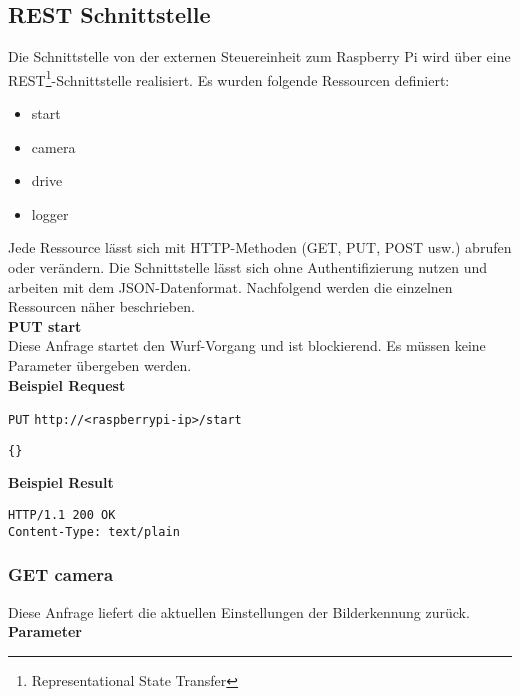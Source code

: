 \subsection{REST Schnittstelle}
\label{sec:rest-schnittstelle}

Die Schnittstelle von der externen Steuereinheit zum Raspberry Pi wird über eine REST\footnote{Representational State Transfer}-Schnittstelle realisiert. Es wurden folgende Ressourcen definiert:
\begin{itemize}
	\item start
	\item camera
	\item drive
	\item logger
\end{itemize}
Jede Ressource lässt sich mit HTTP-Methoden (GET, PUT, POST usw.) abrufen oder verändern. Die Schnittstelle lässt sich ohne Authentifizierung nutzen und arbeiten mit dem JSON-Datenformat. Nachfolgend werden die einzelnen Ressourcen näher beschrieben.\\

\noindent
\textbf{PUT start}\\
Diese Anfrage startet den Wurf-Vorgang und ist blockierend. Es müssen keine Parameter übergeben werden.\\
 
\textbf{Beispiel Request}

\texttt{PUT}
\texttt{http://<raspberrypi-ip>/start}

\begin{lstlisting}[caption=PUT start Request, tabsize=2]
{}
\end{lstlisting}

\textbf{Beispiel Result}

\begin{lstlisting}[caption=PUT start Response, tabsize=2]
HTTP/1.1 200 OK
Content-Type: text/plain
\end{lstlisting}





\subsubsection{GET camera}
Diese Anfrage liefert die aktuellen Einstellungen der Bilderkennung zurück.\\

\textbf{Parameter}

